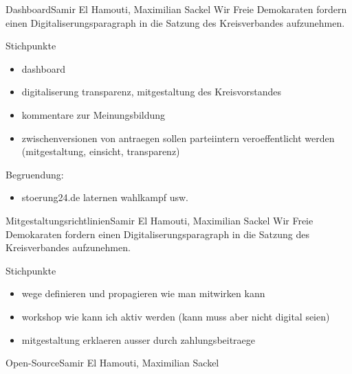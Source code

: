 \documentclass{../../templates/amendment}
\date{18. August 2020}
\begin{document}
\begin{boxed}{Dashboard}{Samir El Hamouti, Maximilian Sackel}
Wir Freie Demokaraten fordern einen Digitaliserungsparagraph in die Satzung des
Kreisverbandes aufzunehmen.

Stichpunkte
\begin{itemize}
    \item dashboard
    \item digitaliserung transparenz, mitgestaltung des Kreisvorstandes
    \item kommentare zur Meinungsbildung
    \item zwischenversionen von antraegen sollen parteiintern veroeffentlicht
        werden (mitgestaltung, einsicht, transparenz)
\end{itemize}
Begruendung:
\begin{itemize}
    \item stoerung24.de laternen wahlkampf usw.
\end{itemize}
\end{boxed}

\begin{boxed}{Mitgestaltungsrichtlinien}{Samir El Hamouti, Maximilian Sackel}
Wir Freie Demokaraten fordern einen Digitaliserungsparagraph in die Satzung des
Kreisverbandes aufzunehmen.

Stichpunkte
\begin{itemize}
    \item wege definieren und propagieren wie man mitwirken kann
    \item workshop wie kann ich aktiv werden (kann muss aber nicht digital
        seien)
    \item mitgestaltung erklaeren ausser durch zahlungsbeitraege
\end{itemize}
\end{boxed}

\begin{boxed}{Open-Source}{Samir El Hamouti, Maximilian Sackel}
\end{boxed}
\end{document}
